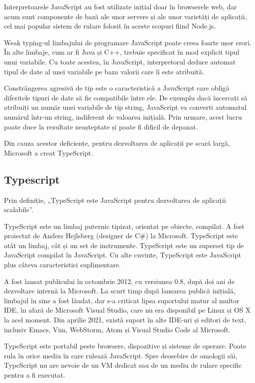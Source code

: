 \documentclass[a4paper,12pt]{article}
\begin{document}
    Interpretoarele JavaScript au fost utilizate inițial doar în browserele web, dar acum sunt componente de bază ale unor servere și ale unor
    varietăți de aplicații, cel mai popular sistem de rulare folosit în aceste scopuri fiind Node.js.
    
    Weak typing-ul limbajului de programare JavaScript poate creea foarte ușor erori. În alte limbaje, cum ar fi Java și C++, trebuie specificat
    în mod explicit tipul unui variabile. Cu toate acestea, în JavaScript, interpretorul deduce automat tipul de date
    al unei variabile pe baza valorii care îi este atribuită.

    Constrângerea agresivă de tip este o caracteristică a JavaScript care obligă diferitele tipuri de date să fie compatibile între ele. De exemplu
    dacă încercați să atribuiți un număr unei variabile de tip string, JavaScript va converti automatul numărul într-un string, indiferent de valoarea inițială.
    Prin urmare, acest lucru poate duce la rezultate neașteptate și poate fi dificil de depanat.

    Din cauza acestor deficiențe, pentru dezvoltarea de aplicații pe scară largă, Microsoft a creat TypeScript.
    \subsection{Typescript}
    Prin definiție, „TypeScript este JavaScript pentru dezvoltarea de aplicații scalabile”.
    
    TypeScript este un limbaj puternic tipizat, orientat pe obiecte, compilat. A fost proiectat de Anders Hejlsberg (designer de C\#) 
    la Microsoft. TypeScript este atât un limbaj, cât și un set de instrumente. TypeScript este un superset tip de JavaScript compilat 
    în JavaScript. Cu alte cuvinte, TypeScript este JavaScript plus câteva caracteristici suplimentare.
    
    A fost lansat publicului în octombrie 2012, cu versiunea 0.8, după doi ani de dezvoltare internă la Microsoft.
    La scurt timp după lansarea publică inițială, limbajul în sine a fost lăudat, dar s-a criticat lipsa suportului matur al multor IDE,
    în afară de Microsoft Visual Studio, care nu era disponibil pe Linux și OS X la acel moment. Din aprilie 2021, există suport
    în alte IDE-uri și editori de text, inclusiv Emacs, Vim, WebStorm, Atom și Visual Studio Code al Microsoft.
    
    TypeScript este portabil peste browsere, dispozitive și sisteme de operare. Poate rula în orice mediu în care rulează JavaScript. 
    Spre deosebire de omologii săi, TypeScript nu are nevoie de un VM dedicat sau de un mediu de rulare specific pentru a fi executat.
\end{document}
